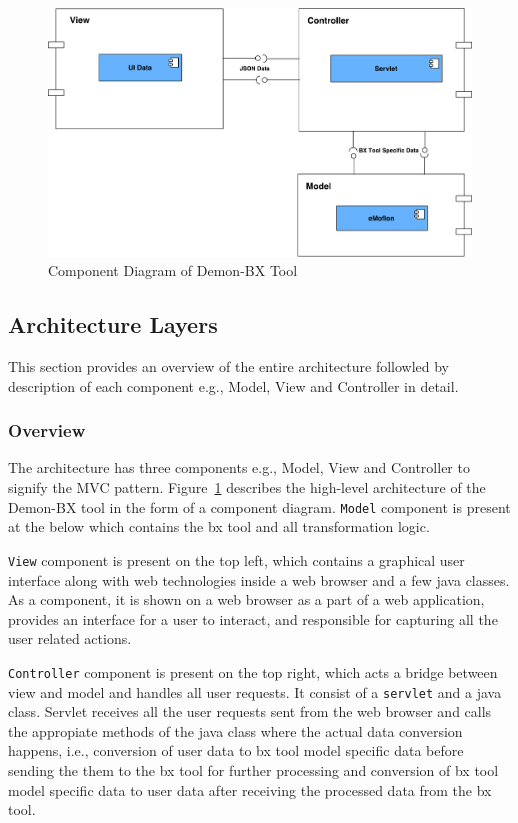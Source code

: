 \begin{figure}
	\includegraphics[width=1\textwidth]{figures/Component_Diagram-HighLevel}
	\caption{Component Diagram of Demon-BX Tool}
	\label{fig:Component_Diagram}
\end{figure}

\subsection{Architecture Layers}\label{subsec:design_layers}
This section provides an overview of the entire architecture followled by description of each component e.g., Model, View and Controller in detail.

\subsubsection{Overview}\label{subsubsec:design_overview}
The architecture has three components e.g., Model, View and Controller to signify the MVC pattern. Figure~\ref{fig:Component_Diagram} describes the high-level architecture of the Demon-BX tool in the form of a component diagram.   \texttt{Model} component is present at the below which contains the bx tool and all transformation logic.

\texttt{View} component is present on the top left, which contains a graphical user interface along with web technologies inside a web browser and a few java classes. As a component, it is shown on a web browser as a part of a web application, provides an interface for a user to interact, and responsible for capturing all the user related actions.

\texttt{Controller} component is present on the top right, which acts a bridge between view and model and handles all user requests. It consist of a \texttt{servlet} and a java class. Servlet receives all the user requests sent from the web browser and calls the appropiate methods of the java class where the actual data conversion happens, i.e., conversion of user data to bx tool model specific data before sending the them to the bx tool for further processing and conversion of bx tool model specific data to user data after receiving the processed data from the bx tool.

